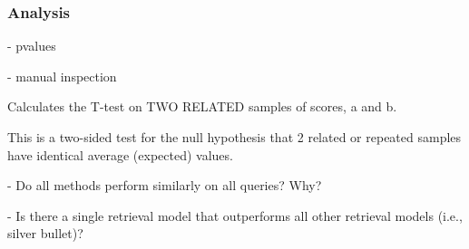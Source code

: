


\subsubsection{Analysis}
\label{AnalysisLexicalModels}

- pvalues

- manual inspection

Calculates the T-test on TWO RELATED samples of scores, a and b.

This is a two-sided test for the null hypothesis that 2 related or repeated samples have identical average (expected) values.



- Do all methods perform similarly on all queries? Why?

- Is there a single retrieval model that outperforms all other retrieval models (i.e., silver bullet)?